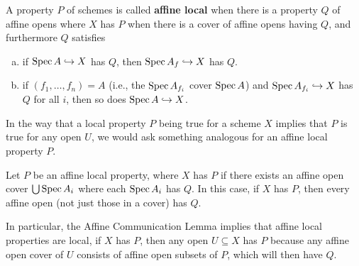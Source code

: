 \documentclass[12pt]{article}
\begin{document}
\begin{defn}
    A property $P$ of schemes is called \textbf{affine local} when there is a property $Q$ of affine opens where $X$ has $P$ when there is a cover of affine opens having $Q$, and furthermore $Q$ satisfies
    \begin{enumerate}[(a)]
        \item if $\operatorname{Spec} A\hookrightarrow X$ has $Q$, then $\operatorname{Spec} A_f \hookrightarrow X$ has $Q$.
        \item if $(f_1,\dots,f_n)=A$ (i.e., the $\operatorname{Spec} A_{f_i}$ cover $\operatorname{Spec} A$) and $\operatorname{Spec} A_{f_i}\hookrightarrow X$ has $Q$ for all $i$, then so does $\operatorname{Spec} A \hookrightarrow X$.
    \end{enumerate}
\end{defn}

In the way that a local property $P$ being true for a scheme $X$ implies that $P$ is true for any open $U$, we would ask something analogous for an affine local property $P$.

\begin{lem}
    Let $P$ be an affine local property, where $X$ has $P$ if there exists an affine open cover $\bigcup \operatorname{Spec} A_i$ where each $\operatorname{Spec} A_i$ has $Q$. In this case, if $X$ has $P$, then every affine open (not just those in a cover) has $Q$.
\end{lem}

In particular, the Affine Communication Lemma implies that affine local properties are local, if $X$ has $P$, then any open $U\subseteq X$ has $P$ because any affine open cover of $U$ consists of affine open subsets of $P$, which will then have $Q$.
\end{document}
